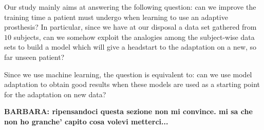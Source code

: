 Our study mainly aims at answering the following question: can we
improve the training time a patient must undergo when learning to use
an adaptive prosthesis? In particular, since we have at our disposal a
data set gathered from $10$ subjects, can we somehow exploit the
analogies among the subject-wise data sets to build a model which will
give a headstart to the adaptation on a new, so far unseen patient?

Since we use machine learning, the question is equivalent to: can we
use model adaptation to obtain good results when these models are used
as a starting point for the adaptation on new data?

\textbf{BARBARA: ripensandoci questa sezione non mi convince. mi sa
che non ho granche' capito cosa volevi metterci...}
